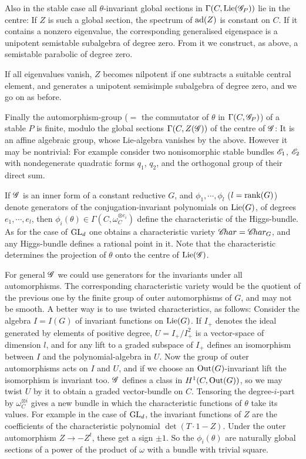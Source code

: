 \documentclass[12pt,english]{smfart}
\theoremstyle{plain} \newtheorem{innerthm}{Theorem} \newtheorem{innerlem}{Lemma} \newtheorem{innerprop}{Proposition} \newtheorem{innercor}{Corollary} \theoremstyle{definition} \newtheorem{innerdefn}{Definition} \newtheorem{innerconstr}{Construction} \theoremstyle{remark} \newtheorem*{remark}{Remark} \newtheorem*{remarks}{Remarks} \newtheorem*{applications}{Applications}
\begin{document}
Also in the stable case all $\theta$-invariant global sections in $\Gamma(C,\operatorname{Lie}(\mathscr{G}_P))$ lie in the centre: If $Z$ is such a global section, the spectrum of $\operatorname{ad}(Z)$ is constant on $C$. If it contains a nonzero eigenvalue, the corresponding generalised eigenspace is a unipotent semistable subalgebra of degree zero. From it we construct, as above, a semistable parabolic of degree zero.

If all eigenvalues vanish, $Z$ becomes nilpotent if one subtracts a suitable central element, and generates a unipotent semisimple subalgebra of degree zero, and we go on as before.

Finally the automorphism-group ($=$ the commutator of $\theta$ in $\Gamma(C,\mathscr{G}_P)$) of a stable $P$ is finite, modulo the global sections $\Gamma(C,Z(\mathscr{G}))$ of the centre of $\mathscr{G}$: It is an affine algebraic group, whose Lie-algebra vanishes by the above. However it may be nontrivial: For example consider two nonisomorphic stable bundles $\mathscr{E}_1$, $\mathscr{E}_2$ with nondegenerate quadratic forms $q_1$, $q_2$, and the orthogonal group of their direct sum.

If $\mathscr{G}$ is an inner form of a constant reductive $G$, and $\phi_1,\cdots,\phi_l$ ($l=\operatorname{rank}(G)$) denote generators of the conjugation-invariant polynomials on $\operatorname{Lie}(G)$, of degrees $e_1,\cdots,e_l$, then $\phi_i(\theta)\in\Gamma(C,\omega_C^{\otimes e_i})$ define the characteristic of the Higgs-bundle. As for the case of $\operatorname{GL}_d$ one obtains a characteristic variety $\mathscr{C}\!har=\mathscr{C}\!har_G$, and any Higgs-bundle defines a rational point in it. Note that the characteristic determines the projection of $\theta$ onto the centre of $\operatorname{Lie}(\mathscr{G})$.

For general $\mathscr{G}$ we could use generators for the invariants under all automorphisms. The corresponding characteristic variety would be the
quotient of the previous one by the finite group of outer automorphisms of $G$, and may not be smooth. A better way is to use twisted characteristics, as follows: Consider the algebra $I=I(G)$ of invariant functions on $\operatorname{Lie}(G)$. If $I_+$ denotes the ideal generated by elements of positive degree, $U=I_+/I_+^2$ is a vector-space of dimension $l$, and for any lift to a graded subspace of $I_+$ defines an isomorphism between $I$ and the polynomial-algebra in $U$. Now the group of outer automorphisms acts on $I$ and $U$, and if we choose an $\operatorname{Out}(G)$-invariant lift the isomorphism is invariant too. $\mathscr{G}$ defines a class in $H^1(C,\operatorname{Out}(G))$, so we may twist $U$ by it to obtain a graded vector-bundle on $C$. Tensoring the degree-$i$-part by $\omega_C^{\otimes i}$ gives a new bundle in which the characteristic functions of $\theta$ take its values. For example in the case of $\operatorname{GL}_d$, the invariant functions of $Z$ are the coefficients of the characteristic polynomial $\det(T\cdot 1-Z)$. Under the outer automorphism $Z\to -Z^t$, these get a sign $\pm 1$. So the $\phi_i(\theta)$ are naturally global sections of a power of the product of $\omega$ with a bundle with trivial square.
\end{document}
